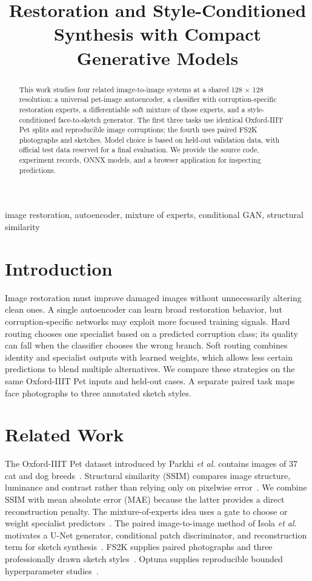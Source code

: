 \documentclass[conference]{IEEEtran}
\title{Restoration and Style-Conditioned Synthesis with Compact Generative Models}
\author{\IEEEauthorblockN{Syed Ashher Majid (23i-0007)}
\IEEEauthorblockA{Department of Computer Science\\FAST NUCES, Islamabad\\Generative AI, CS(A)\\Instructor: Dr Akhtar Jamil}}
\begin{document}
\maketitle

\begin{abstract}
This work studies four related image-to-image systems at a shared 128 $\times$ 128 resolution: a universal pet-image autoencoder, a classifier with corruption-specific restoration experts, a differentiable soft mixture of those experts, and a style-conditioned face-to-sketch generator. The first three tasks use identical Oxford-IIIT Pet splits and reproducible image corruptions; the fourth uses paired FS2K photographs and sketches. Model choice is based on held-out validation data, with official test data reserved for a final evaluation. We provide the source code, experiment records, ONNX models, and a browser application for inspecting predictions.
\end{abstract}

\begin{IEEEkeywords}
image restoration, autoencoder, mixture of experts, conditional GAN, structural similarity
\end{IEEEkeywords}

\section{Introduction}
Image restoration must improve damaged images without unnecessarily altering clean ones. A single autoencoder can learn broad restoration behavior, but corruption-specific networks may exploit more focused training signals. Hard routing chooses one specialist based on a predicted corruption class; its quality can fall when the classifier chooses the wrong branch. Soft routing combines identity and specialist outputs with learned weights, which allows less certain predictions to blend multiple alternatives. We compare these strategies on the same Oxford-IIIT Pet inputs and held-out cases. A separate paired task maps face photographs to three annotated sketch styles.

\section{Related Work}
The Oxford-IIIT Pet dataset introduced by Parkhi \emph{et al.} contains images of 37 cat and dog breeds~\cite{parkhi2012}. Structural similarity (SSIM) compares image structure, luminance and contrast rather than relying only on pixelwise error~\cite{wang2004}. We combine SSIM with mean absolute error (MAE) because the latter provides a direct reconstruction penalty. The mixture-of-experts idea uses a gate to choose or weight specialist predictors~\cite{jacobs1991}. The paired image-to-image method of Isola \emph{et al.} motivates a U-Net generator, conditional patch discriminator, and reconstruction term for sketch synthesis~\cite{isola2017}. FS2K supplies paired photographs and three professionally drawn sketch styles~\cite{fan2022}. Optuna supplies reproducible bounded hyperparameter studies~\cite{akiba2019}.
\end{document}
